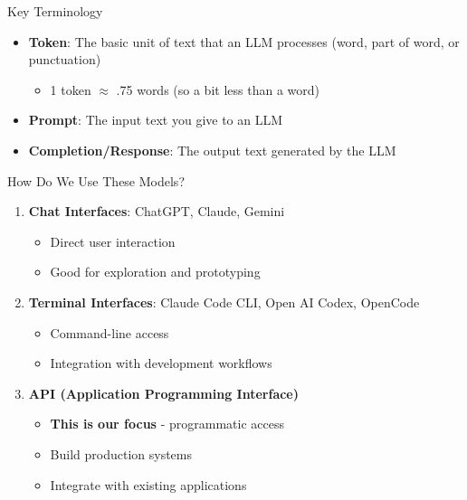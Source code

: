 \documentclass[aspectratio=169]{beamer}
\begin{document}
\begin{frame}{Key Terminology}
\begin{itemize}
    \item \textbf{Token}: The basic unit of text that an LLM processes (word, part of word, or punctuation)
\begin{itemize}
\item  1 token $\approx$ .75 words (so a bit less than a word)
\end{itemize}
    \item \textbf{Prompt}: The input text you give to an LLM
    \item \textbf{Completion/Response}: The output text generated by the LLM
\end{itemize}
\end{frame}


\begin{frame}{How Do We Use These Models?}
\begin{enumerate}
    \item \textbf{Chat Interfaces}: ChatGPT, Claude, Gemini
    \begin{itemize}
        \item Direct user interaction
        \item Good for exploration and prototyping
    \end{itemize}
    \item \textbf{Terminal Interfaces}: Claude Code CLI, Open AI Codex, OpenCode
    \begin{itemize}
        \item Command-line access
        \item Integration with development workflows
    \end{itemize}
    \item \textbf{API (Application Programming Interface)}
    \begin{itemize}
        \item \textbf{This is our focus} - programmatic access
        \item Build production systems
        \item Integrate with existing applications
    \end{itemize}
    \end{enumerate}
\end{frame}
\end{document}
